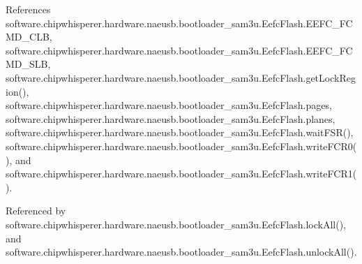 References software.\+chipwhisperer.\+hardware.\+naeusb.\+bootloader\+\_\+sam3u.\+Eefc\+Flash.\+E\+E\+F\+C\+\_\+\+F\+C\+M\+D\+\_\+\+C\+L\+B, software.\+chipwhisperer.\+hardware.\+naeusb.\+bootloader\+\_\+sam3u.\+Eefc\+Flash.\+E\+E\+F\+C\+\_\+\+F\+C\+M\+D\+\_\+\+S\+L\+B, software.\+chipwhisperer.\+hardware.\+naeusb.\+bootloader\+\_\+sam3u.\+Eefc\+Flash.\+get\+Lock\+Region(), software.\+chipwhisperer.\+hardware.\+naeusb.\+bootloader\+\_\+sam3u.\+Eefc\+Flash.\+pages, software.\+chipwhisperer.\+hardware.\+naeusb.\+bootloader\+\_\+sam3u.\+Eefc\+Flash.\+planes, software.\+chipwhisperer.\+hardware.\+naeusb.\+bootloader\+\_\+sam3u.\+Eefc\+Flash.\+wait\+F\+S\+R(), software.\+chipwhisperer.\+hardware.\+naeusb.\+bootloader\+\_\+sam3u.\+Eefc\+Flash.\+write\+F\+C\+R0(), and software.\+chipwhisperer.\+hardware.\+naeusb.\+bootloader\+\_\+sam3u.\+Eefc\+Flash.\+write\+F\+C\+R1().



Referenced by software.\+chipwhisperer.\+hardware.\+naeusb.\+bootloader\+\_\+sam3u.\+Eefc\+Flash.\+lock\+All(), and software.\+chipwhisperer.\+hardware.\+naeusb.\+bootloader\+\_\+sam3u.\+Eefc\+Flash.\+unlock\+All().


